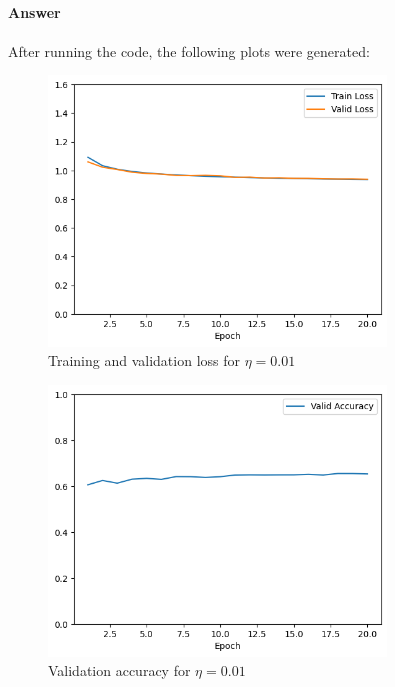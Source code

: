 \documentclass{article}
\begin{document}
\subsection{}

\paragraph{Answer} After running the code, the following plots were generated:

\begin{figure}[H]
    \centering
    \includegraphics[width=0.8\textwidth]{"plots/logistic_regression-training-loss-batch-16-lr-0.01-epochs-20-l2-0-opt-sgd.png"}
    \caption{Training and validation loss for $\eta = 0.01$}
    \label{2.1 0.01 Loss Plot}
\end{figure}

\begin{figure}[H]
    \centering
    \includegraphics[width=0.8\textwidth]{"plots/logistic_regression-validation-accuracy-batch-16-lr-0.01-epochs-20-l2-0-opt-sgd.png"}
    \caption{Validation accuracy for $\eta = 0.01$}
    \label{2.1 0.01 Acc Plot}
\end{figure}
\end{document}
